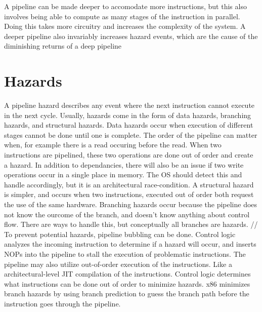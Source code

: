 \documentclass[letterpaper,10pt,titlepage]{article}
\begin{document}
    A pipeline can be made deeper to accomodate more instructions, but this also involves being able 
    to compute as many stages of the instruction in parallel. Doing this takes more circuitry and increases 
    the complexity of the system. A deeper pipeline also invariably increases hazard events, which are the 
    cause of the diminishing returns of a deep pipeline\\

\pagebreak

\section{Hazards}
    
    A pipeline hazard describes any event where the next instruction cannot execute in the next cycle. 
    Usually, hazards come in the form of data hazards, branching hazards, and structural hazards. Data hazards
    occur when execution of different stages cannot be done until one is complete. The order of the pipeline can 
    matter when, for example there is a read occuring before the read. When two instructions are pipelined, these 
    two operations are done out of order and create a hazard. In addition to dependancies, there will also be an issue
    if two write operations occur in a single place in memory. The OS should detect this and handle accordingly, but 
    it is an architectural race-condition. A structural hazard is simpler, and occurs when two instructions, executed out of order
    both request the use of the same hardware. Branching hazards occur because the pipeline does not know the ourcome of the 
    branch, and doesn't know anything about control flow. There are ways to handle this, but conceptually all branches are hazards. //
    To prevent potential hazards, pipeline bubbling can be done. Control logic analyzes the incoming instruction to determine
    if a hazard will occur, and inserts NOPs into the pipeline to stall the execution of problematic instructions. The pipeline 
    may also utilize out-of-order execution of the instructions. Like a architectural-level JIT compilation of the instructions.
    Control logic determines what instructions can be done out of order to minimize hazards. x86 minimizes branch hazards by using 
    branch prediction to guess the branch path before the instruction goes through the pipeline.\\

\pagebreak

\section{}
    
\pagebreak
\end{document}
